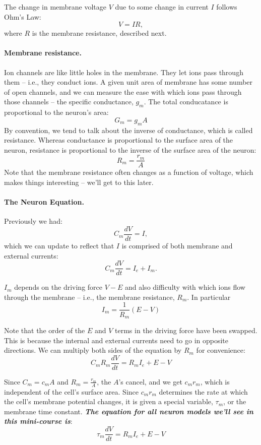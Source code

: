 \documentclass[12pt]{article}
\begin{document}
The change in membrane voltage $V$ due to some change in current $I$ follows Ohm's Law:
\[
V = IR,
\]
where $R$ is the membrane resistance, described next.

\paragraph{Membrane resistance.}  Ion channels are like little holes in the membrane.  They let ions pass through them -- i.e., they conduct ions.  A given unit area of membrane has some number of open channels, and we can measure the ease with which ions pass through those channels -- the specific conductance, $g_m$.  The total conducatance is proportional to the neuron's area:
\[
G_m = g_mA
\]
By convention, we tend to talk about the inverse of conductance, which is called resistance.  Whereas conductance is proportional to the surface area of the neuron, resistance is proportional to the inverse of the surface area of the neuron:
\[
R_m = \frac{r_m}{A}
\]
Note that the membrane resistance often changes as a function of voltage, which makes things interesting -- we'll get to this later.

\paragraph{The Neuron Equation.}  Previously we had:
\[
C_m \frac{dV}{dt} = I,
\]
which we can update to reflect that $I$ is comprised of both membrane and external currents:
\[
C_m \frac{dV}{dt} = I_e + I_m.
\]

$I_m$ depends on the driving force $V - E$ and also difficulty with which ions flow through the membrane -- i.e., the membrane resistance, $R_m$.  In particular
\[
I_m = \frac{1}{R_m}(E - V)
\]

Note that the order of the $E$ and $V$ terms in the driving force have
been swapped.  This is because the internal and external currents need
to go in opposite directions.  We can multiply both sides of the equation by $R_m$ for convenience:
\[
C_mR_m\frac{dV}{dt} = R_mI_e + E - V
\]

Since $C_m = c_mA$ and $R_m = \frac{r_m}{A}$, the $A$'s cancel, and we get $c_mr_m$, which is independent of the cell's surface area.  Since $c_mr_m$ determines the rate at which the cell's membrane potential changes, it is given a special variable, $\tau_m$, or the membrane time constant.  \textbf{\em{The equation for all neuron models we'll see in this mini-course is}}:
\[
\tau_m\frac{dV}{dt} = R_mI_e + E - V
\]
\end{document}
